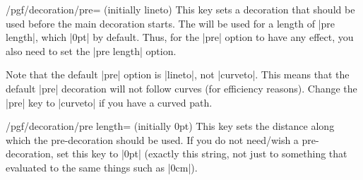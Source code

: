 \begin{key}{/pgf/decoration/pre= (initially lineto)}
  This key sets a decoration that should be used before the main
  decoration starts. The  will be used for a length
  of |pre length|, which |0pt| by default. Thus, for the |pre| option
  to have any effect, you also need to set the |pre length| option.
\begin{codeexample}[]
\end{codeexample}
\begin{codeexample}[]
\end{codeexample}
\begin{codeexample}[]
\end{codeexample}

  Note that the default |pre| option is |lineto|, not |curveto|. This
  means that the default |pre| decoration will not follow curves (for
  efficiency reasons). Change the |pre| key to |curveto| if you have a
  curved path. 
\begin{codeexample}[]
\end{codeexample}
\begin{codeexample}[]
\end{codeexample}
\end{key}

\begin{key}{/pgf/decoration/pre length= (initially 0pt)}
  This key sets the distance along which the pre-decoration should be
  used. If you do not need/wish a pre-decoration, set this key to
  |0pt| (exactly this string, not just to something that evaluated to
  the same things such as |0cm|).
\end{key}

